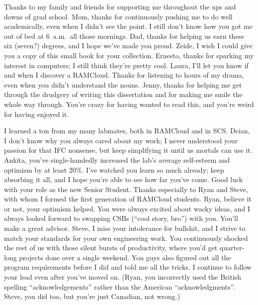 
Thanks to my family and friends for supporting me throughout the ups and
downs of grad school. Mom, thanks for continuously pushing me to do well
academically, even when I didn't see the point. I still don't know how
you got me out of bed at 6~a.m.\ all those mornings. Dad, thanks for
helping us earn these six (seven?) degrees, and I hope we've made you proud.
Zeide, I wish I could give
you a copy of this small book for your collection. Ernesto, thanks for
sparking my interest in computers; I still think they're pretty cool.
Laura, I'll let you know if and when I discover a RAMCloud. Thanks for
listening to hours of my drama, even when you didn't understand the
nouns. Jenny, thanks for helping me get through the drudgery of writing
this dissertation and for making me smile the whole way through. You're
crazy for having wanted to read this, and you're weird for having
enjoyed it.

I learned a ton from my many labmates, both in RAMCloud and in SCS.
Deian, I don't know why you always cared about my work; I never
understood your passion for that IFC nonsense, but keep simplifying it
until us mortals can use it. Ankita, you've single-handedly increased
the lab's average self-esteem and optimism by at least 20\%. I've
watched you learn so much already; keep absorbing it all, and I hope
you're able to see how far you've come. Good luck with your role as the
new Senior Student. Thanks especially to Ryan and Steve, with whom I
formed the first generation of RAMCloud students. Ryan, believe it or
not, your optimism helped. You were always excited about wacky ideas,
and I always looked forward to swapping CSBs (``cool story, bro'') with
you. You'll make a great advisor. Steve, I miss your intolerance for
bullshit, and I strive to match your standards for your own engineering
work. You continuously shocked the rest of us with those silent bursts
of productivity, where you'd get quarter-long projects done over a
single weekend. You guys also figured out all the program requirements
before I did and told me all the tricks. I continue to follow your lead
even after you've moved on. (Ryan, you incorrectly used the British
spelling ``acknowledgements'' rather than the American
``acknowledgments''. Steve, you did too, but you're just Canadian, not
wrong.)

